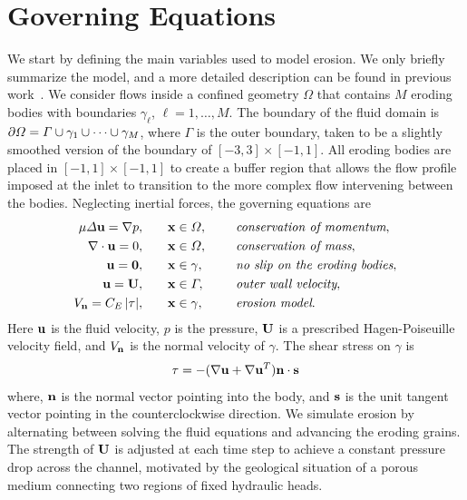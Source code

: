\documentclass{jfm}
\begin{document}
\section{Governing Equations}
\label{sec:formulation}
We start by defining the main variables used to model erosion.  We only
briefly summarize the model, and a more detailed description can be
found in previous work~\citep{qua-moo2018}.  We consider flows inside a
confined geometry $\Omega$ that contains $M$ eroding bodies with
boundaries $\gamma_\ell$, $\ell = 1,\ldots,M$.  The boundary of the
fluid domain is $\bd \Omega = \Gamma \cup \gamma_1 \cup \cdots \cup
\gamma_M$, where $\Gamma$ is the outer boundary, taken to be a slightly
smoothed version of the boundary of $[-3,3] \times [-1,1]$.  All eroding
bodies are placed in $[-1,1] \times [-1,1]$ to create a buffer region
that allows the flow profile imposed at the inlet to transition to the
more complex flow intervening between the bodies. Neglecting inertial
forces, the governing equations are
\begin{equation}
\label{eqn:erosionModel}
  \begin{split}
    \mu \Delta \uu = \grad p, &\hspace{20pt} \xx \in \Omega, \gap 
      &&\mbox{\em conservation of momentum}, \\
    \grad \cdot \uu = 0, &\hspace{20pt} \xx \in \Omega, \gap 
      &&\mbox{\em conservation of mass}, \\
    \uu = \mathbf{0}, &\hspace{20pt} \xx \in \gamma, \gap 
      &&\mbox{\em no slip on the eroding bodies}, \\
    \uu = \UU, &\hspace{20pt} \xx \in \Gamma, \gap 
      &&\mbox{\em outer wall velocity}, \\
    \Vn = \CE \, \abs{\tau}, &\hspace{20pt} \xx \in \gamma,
      &&\mbox{\em erosion model}.
  \end{split}
\end{equation}
Here $\uu$ is the fluid velocity, $p$ is the pressure, $\UU$ is a
prescribed Hagen-Poiseuille velocity field, and $\Vn$ is the normal
velocity of $\gamma$. The shear stress on $\gamma$ is
\begin{align}
  \tau = -(\nabla \uu + \nabla \uu^T) \nn \cdot \ss
  \label{eqn:shearStress}
\end{align}
where, $\nn$ is the normal vector pointing into the body, and $\ss$ is
the unit tangent vector pointing in the counterclockwise direction. We
simulate erosion by alternating between solving the fluid equations and
advancing the eroding grains.  The strength of $\UU$ is adjusted at each
time step to achieve a constant pressure drop across the channel,
motivated by the geological situation of a porous medium connecting two
regions of  fixed hydraulic heads.
\end{document}
